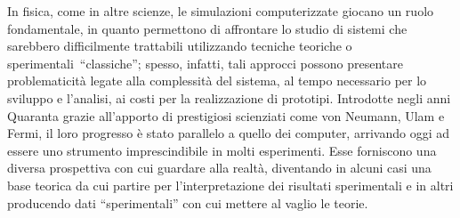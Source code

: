 In fisica, come in altre scienze, le simulazioni computerizzate giocano un ruolo fondamentale, in quanto permettono di affrontare lo studio di sistemi che sarebbero difficilmente trattabili utilizzando tecniche teoriche o sperimentali~``classiche'';
spesso, infatti, tali approcci possono presentare problematicità legate alla complessità del sistema, al tempo necessario per lo sviluppo e l'analisi, ai costi per la realizzazione di prototipi.
Introdotte negli anni Quaranta grazie all'apporto di prestigiosi scienziati come von Neumann, Ulam e Fermi, il loro progresso è stato parallelo a quello dei computer, arrivando oggi ad essere uno strumento imprescindibile in molti esperimenti.
Esse forniscono una diversa prospettiva con cui guardare alla realtà, diventando in alcuni casi una base teorica da cui partire per l'interpretazione dei risultati sperimentali e in altri producendo dati ``sperimentali'' con cui mettere al vaglio le teorie.

